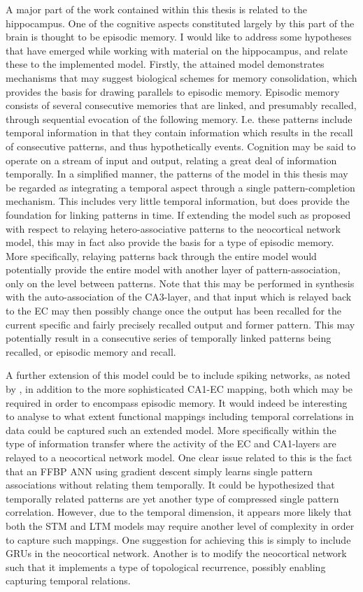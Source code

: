A major part of the work contained within this thesis is related to the hippocampus. One of the cognitive aspects constituted largely by this part of the brain is thought to be episodic memory. I would like to address some hypotheses that have emerged while working with material on the hippocampus, and relate these to the implemented model.
Firstly, the attained model demonstrates mechanisms that may suggest biological schemes for memory consolidation, which provides the basis for drawing parallels to episodic memory. Episodic memory consists of several consecutive memories that are linked, and presumably recalled, through sequential evocation of the following memory. I.e. these patterns include temporal information in that they contain information which results in the recall of consecutive patterns, and thus hypothetically events.
Cognition may be said to operate on a stream of input and output, relating a great deal of information temporally. 
In a simplified manner, the patterns of the model in this thesis may be regarded as integrating a temporal aspect through a single pattern-completion mechanism. This includes very little temporal information, but does provide the foundation for linking patterns in time. 
If extending the model such as proposed with respect to relaying hetero-associative patterns to the neocortical network model, this may in fact also provide the basis for a type of episodic memory.
More specifically, relaying patterns back through the entire model would potentially provide the entire model with another layer of pattern-association, only on the level between patterns. Note that this may be performed in synthesis with the auto-association of the CA3-layer, and that input which is relayed back to the EC may then possibly change once the output has been recalled for the current specific and fairly precisely recalled output and former pattern. This may potentially result in a consecutive series of temporally linked patterns being recalled, or episodic memory and recall.

A further extension of this model could be to include spiking networks, as noted by \cite{Hattori2014}, in addition to the more sophisticated CA1-EC mapping, both which may be required in order to encompass episodic memory.
It would indeed be interesting to analyse to what extent functional mappings including temporal correlations in data could be captured such an extended model. More specifically within the type of information transfer where the activity of the EC and CA1-layers are relayed to a neocortical network model.
One clear issue related to this is the fact that an FFBP ANN using gradient descent simply learns single pattern associations without relating them temporally.
It could be hypothesized that temporally related patterns are yet another type of compressed single pattern correlation. However, due to the temporal dimension, it appears more likely that both the STM and LTM models may require another level of complexity in order to capture such mappings. One suggestion for achieving this is simply to include GRUs in the neocortical network. Another is to modify the neocortical network such that it implements a type of topological recurrence, possibly enabling capturing temporal relations.

